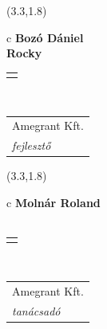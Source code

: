 \documentclass[11pt]{article}
\begin{document}
\makebox(3.3,1.8){
  \renewcommand\arraystretch{1.3}
  \begin{tabular}[c]{c}
    \hspace{8.5mm}
    \LARGE\bf{ Bozó Dániel }\\
    \hspace{8.5mm}
    \Large{ Rocky }\\
    \renewcommand\arraystretch{3}
    \begin{tabular}[c]{c}
      \centering
      \fontfamily{phv}\selectfont{
        \textbf{
          \textsc{
            \scriptsize{
            \color{Bright}{ Ismerkedő }\color{Bright}{ Webmester }\color{Bright}{ Sminkmester }\color{Dark}{ Programozó }
            }
          }
        }
      }
    \end{tabular}
    \\
    \renewcommand\arraystretch{1}
    \begin{tabular}{p{3.3in}}
      \hspace{.7cm}Amegrant Kft.\\
      \hspace{.7cm}\emph{ fejlesztő }\\
    \end{tabular}
  \end{tabular}
}

\makebox(3.3,1.8){
  \renewcommand\arraystretch{1.3}
  \begin{tabular}[c]{c}
    \hspace{8.5mm}
    \LARGE\bf{ Molnár Roland }\\
    \hspace{8.5mm}
    \Large{  }\\
    \renewcommand\arraystretch{3}
    \begin{tabular}[c]{c}
      \centering
      \fontfamily{phv}\selectfont{
        \textbf{
          \textsc{
            \scriptsize{
            \color{Dark}{ Ismerkedő }\color{Dark}{ Webmester }\color{Bright}{ Sminkmester }\color{Bright}{ Programozó }
            }
          }
        }
      }
    \end{tabular}
    \\
    \renewcommand\arraystretch{1}
    \begin{tabular}{p{3.3in}}
      \hspace{.7cm}Amegrant Kft.\\
      \hspace{.7cm}\emph{ tanácsadó }\\
    \end{tabular}
  \end{tabular}
}
\end{document}

